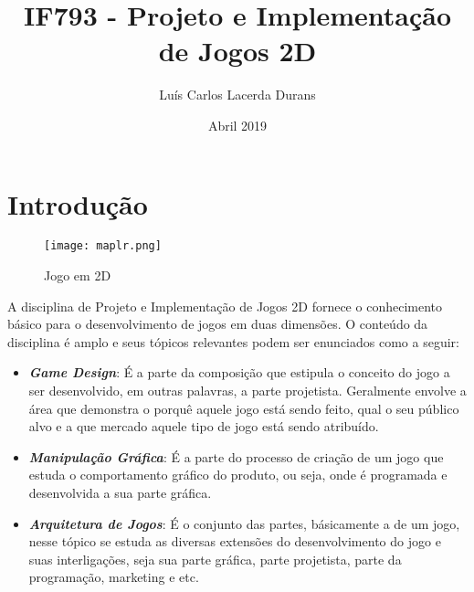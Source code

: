 \documentclass[10pt]{article}
\title{IF793 - Projeto e Implementação de Jogos 2D}
\author{Luís Carlos Lacerda Durans}
\date{Abril 2019}
\begin{document}
\maketitle

\section{Introdução}

\begin{figure}[h!]
\centering
\texttt{[image: maplr.png]}
\caption{Jogo em 2D \citep{maple}}
\label{fig:maplr}
\end{figure}

\noindent A disciplina de Projeto e Implementação de Jogos 2D fornece o conhecimento básico para o desenvolvimento de jogos em duas dimensões. O conteúdo da disciplina é amplo e seus tópicos relevantes podem ser enunciados como a seguir:

\begin{itemize}
\item \textbf{\textit{Game Design}}: É a parte da composição que estipula o conceito do jogo a ser desenvolvido, em outras palavras, a parte projetista. Geralmente envolve a área que demonstra o porquê aquele jogo está sendo feito, qual o seu público alvo e a que mercado aquele tipo de jogo está sendo atribuído.
\end{itemize}
\begin{itemize}
\item \textbf{\textit{Manipulação Gráfica}}: É a parte do processo de criação de um jogo que estuda o comportamento gráfico do produto, ou seja, onde é programada e desenvolvida a sua parte gráfica.
\end{itemize}
\begin{itemize}
\item \textbf{\textit{Arquitetura de Jogos}}: É o conjunto das partes, básicamente a  de um jogo, nesse tópico se estuda as diversas extensões do desenvolvimento do jogo e suas interligações, seja sua parte gráfica, parte projetista, parte da programação, marketing e etc. 
\end{itemize}
\end{document}
